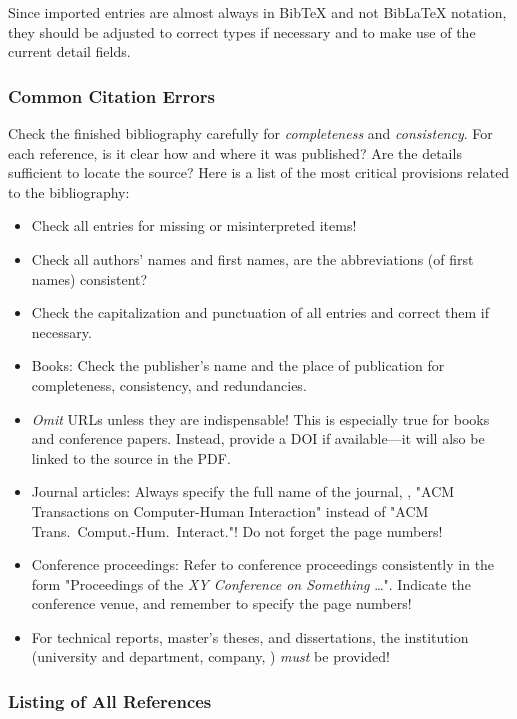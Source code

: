 Since imported entries are almost always in BibTeX and not BibLaTeX notation,
they should be adjusted to correct types if necessary and to make use of the
current detail fields.

\subsubsection{Common Citation Errors}

Check the finished bibliography carefully for \emph{completeness} and
\emph{consistency}. For each reference, is it clear how and where it was
published? Are the details sufficient to locate the source? Here is a list of
the most critical provisions related to the bibliography:
%
\begin{itemize}
    \item Check all entries for missing or misinterpreted items!
    \item Check all authors' names and first names, are the abbreviations (of
    first names) consistent?
    \item Check the capitalization and punctuation of all entries and correct
    them if necessary.
    \item Books: Check the publisher's name and the place of publication for 
    completeness, consistency, and redundancies.
    \item \emph{Omit} URLs unless they are indispensable! This is especially
    true for books and conference papers. Instead, provide a DOI if
    available---it will also be linked to the source in the PDF.
    \item Journal articles: Always specify the full name of the journal, \eg,
    "ACM Transactions on Computer-Human Interaction" instead of "ACM Trans.\
    Comput.-Hum.\ Interact."! Do not forget the page numbers!
    \item Conference proceedings: Refer to conference proceedings consistently
    in the form "Proceedings of the \emph{XY Conference on Something} \ldots".
    Indicate the conference venue, and remember to specify the page numbers!
    \item For technical reports, master's theses, and dissertations, the
    institution (university and department, company, \etc) \emph{must} be
    provided!
\end{itemize}

\subsubsection{Listing of All References}

